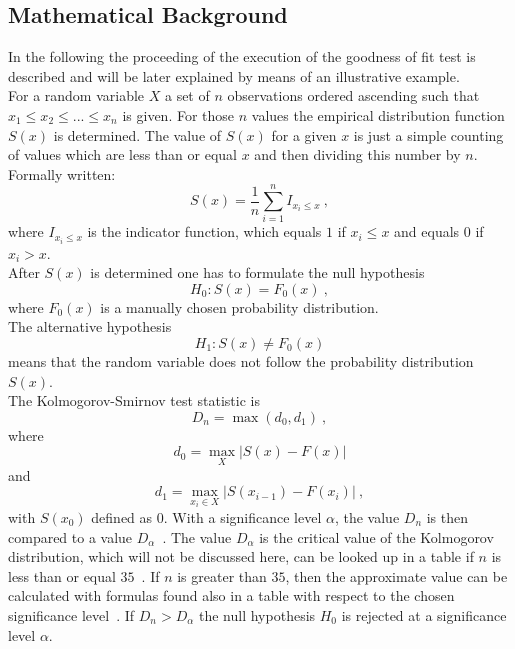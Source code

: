 \documentclass{article}
\begin{document}
\subsection{Mathematical Background}
In the following the proceeding of the execution of the goodness of fit test is described and will be later explained by means of an illustrative example. \\
For a random variable $X$ a set of $n$ observations ordered ascending such that $x_1 \le x_2 \le ... \le x_n$ is given. For those $n$ values the empirical distribution function $S(x)$  is determined.
The value of $S(x)$ for a given $x$ is just a simple counting of values which are less than or equal $x$ and then dividing this number by $n$. Formally written: 
$$S(x) = \frac{1}{n} \sum\limits^n_{i=1} I_{x_i\le x}~,$$
where $I_{x_i\le x}$ is the indicator function, which equals $1$ if $x_i\le x$ and equals $0$ if $x_i>x$.\\
After $S(x)$  is determined one has to formulate the null hypothesis 
$$H_0:S (x)=F_0 (x)~,$$ 
where $F_0 (x)$ is a manually chosen probability distribution.\\
The alternative hypothesis 
$$H_1:S (x)\ne F_0 (x)$$ 
means that the random variable does not follow the probability distribution $S(x)$.\\
The Kolmogorov-Smirnov test statistic is
$$D_n = \max (d_0,d_1)~,$$
where 
$$d_0=\max_{X} |S(x)-F(x)|$$ 
and
$$d_1 = \max_{x_i \in X} | S(x_{i-1})-F(x_i)|~,$$
with $S (x_0)$  defined as $0$. With a significance level $\alpha$, the value $D_n$ is then compared to a value $D_\alpha$~\cite{nagcKS}.
The value $D_\alpha$ is the critical value of the Kolmogorov distribution, which will not be discussed here, can be looked up in a table if $n$ is less than or equal $35$~\cite{massey1951}. If $n$ is greater than $35$, then the approximate value can be calculated with formulas found also in a table with respect to the chosen significance level~\cite{massey1951}. If $D_n>D_\alpha$ the null hypothesis $H_0$  is rejected at a significance level $\alpha$.

\end{document}
